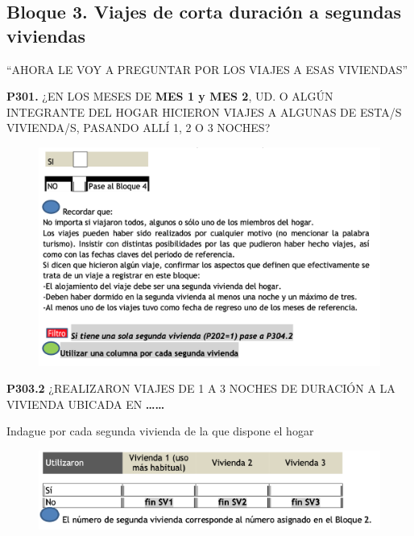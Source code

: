 \documentclass[
  openany]{book}
\begin{document}
\hypertarget{bloque-3.-viajes-de-corta-duraciuxf3n-a-segundas-viviendas}{%
\subsection{Bloque 3. Viajes de corta duración a segundas viviendas}\label{bloque-3.-viajes-de-corta-duraciuxf3n-a-segundas-viviendas}}

``AHORA LE VOY A PREGUNTAR POR LOS VIAJES A ESAS VIVIENDAS''

\textbf{P301.} ¿EN LOS MESES DE \textbf{MES 1 y MES 2}, UD. O ALGÚN INTEGRANTE DEL HOGAR HICIERON VIAJES A ALGUNAS DE ESTA/S VIVIENDA/S, PASANDO ALLÍ 1, 2 O 3 NOCHES?

\begin{figure}

{\centering \includegraphics[width=1\linewidth]{imagenes/figura6-158} 

}

\end{figure}

\textbf{P303.2} ¿REALIZARON VIAJES DE 1 A 3 NOCHES DE DURACIÓN A LA VIVIENDA UBICADA EN
\textbf{\ldots\ldots{}}

Indague por cada segunda vivienda de la que dispone el hogar

\begin{figure}

{\centering \includegraphics[width=1\linewidth]{imagenes/figura6-159} 

}

\end{figure}
\end{document}
